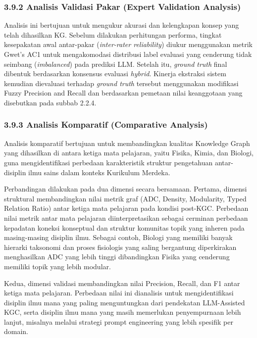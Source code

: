 \documentclass[
]{article}
\begin{document}
\hypertarget{analisis-validasi-pakar-expert-validation-analysis}{%
\subsubsection{3.9.2 Analisis Validasi Pakar (Expert Validation
Analysis)}\label{analisis-validasi-pakar-expert-validation-analysis}}

Analisis ini bertujuan untuk mengukur akurasi dan kelengkapan konsep
yang telah dihasilkan KG. Sebelum dilakukan perhitungan performa,
tingkat kesepakatan awal antar-pakar (\emph{inter-rater reliability})
diukur menggunakan metrik Gwet's AC1 untuk mengakomodasi distribusi
label evaluasi yang cenderung tidak seimbang (\emph{imbalanced}) pada
prediksi LLM. Setelah itu, \emph{ground truth} final dibentuk
berdasarkan konsensus evaluasi \emph{hybrid}. Kinerja ekstraksi sistem
kemudian dievaluasi terhadap \emph{ground truth} tersebut menggunakan
modifikasi Fuzzy Precision and Recall dan berdasarkan pemetaan nilai
keanggotaan yang disebutkan pada subbab 2.2.4.

\hypertarget{analisis-komparatif-comparative-analysis}{%
\subsubsection{3.9.3 Analisis Komparatif (Comparative
Analysis)}\label{analisis-komparatif-comparative-analysis}}

Analisis komparatif bertujuan untuk membandingkan kualitas Knowledge
Graph yang dihasilkan di antara ketiga mata pelajaran, yaitu Fisika,
Kimia, dan Biologi, guna mengidentifikasi perbedaan karakteristik
struktur pengetahuan antar-disiplin ilmu sains dalam konteks Kurikulum
Merdeka.

Perbandingan dilakukan pada dua dimensi secara bersamaan. Pertama,
dimensi struktural membandingkan nilai metrik graf (ADC, Density,
Modularity, Typed Relation Ratio) antar ketiga mata pelajaran pada
kondisi post-KGC. Perbedaan nilai metrik antar mata pelajaran
diinterpretasikan sebagai cerminan perbedaan kepadatan koneksi
konseptual dan struktur komunitas topik yang inheren pada masing-masing
disiplin ilmu. Sebagai contoh, Biologi yang memiliki banyak hierarki
taksonomi dan proses fisiologis yang saling bergantung diperkirakan
menghasilkan ADC yang lebih tinggi dibandingkan Fisika yang cenderung
memiliki topik yang lebih modular.

Kedua, dimensi validasi membandingkan nilai Precision, Recall, dan F1
antar ketiga mata pelajaran. Perbedaan nilai ini dianalisis untuk
mengidentifikasi disiplin ilmu mana yang paling menguntungkan dari
pendekatan LLM-Assisted KGC, serta disiplin ilmu mana yang masih
memerlukan penyempurnaan lebih lanjut, misalnya melalui strategi prompt
engineering yang lebih spesifik per domain.
\end{document}
